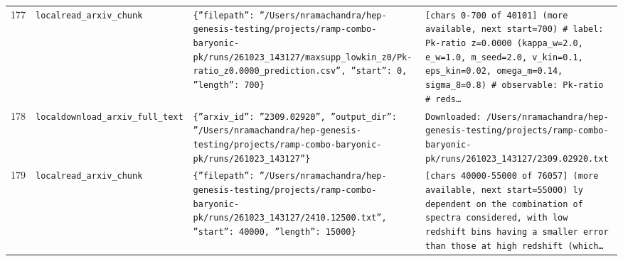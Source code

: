 \documentclass[11pt,a4paper]{article}
\begin{document}
\begin{longtable}{@{}p{}p{}p{}p{}@{}}
177 & \texttt{local}\newline\texttt{read\_\allowbreak{}arxiv\_\allowbreak{}chunk} & \texttt{\{''filepath'':\allowbreak{} ''/\allowbreak{}Users/\allowbreak{}nramachandra/\allowbreak{}hep-genesis-testing/\allowbreak{}projects/\allowbreak{}ramp-combo-baryonic-pk/\allowbreak{}runs/\allowbreak{}261023\_\allowbreak{}143127/\allowbreak{}maxsupp\_\allowbreak{}lowkin\_\allowbreak{}z0/\allowbreak{}Pk-ratio\_\allowbreak{}z0.0000\_\allowbreak{}prediction.csv'',\allowbreak{} ''start'':\allowbreak{} 0,\allowbreak{} ''length'':\allowbreak{} 700\}\allowbreak{}} & \texttt{[chars 0-700 of 40101]\allowbreak{} (more available,\allowbreak{} next start=\allowbreak{}700)\allowbreak{}  \# label:\allowbreak{} Pk-ratio z=\allowbreak{}0.0000 (kappa\_\allowbreak{}w=\allowbreak{}2.0,\allowbreak{} e\_\allowbreak{}w=\allowbreak{}1.0,\allowbreak{} m\_\allowbreak{}seed=\allowbreak{}2.0,\allowbreak{} v\_\allowbreak{}kin=\allowbreak{}0.1,\allowbreak{} eps\_\allowbreak{}kin=\allowbreak{}0.02,\allowbreak{} omega\_\allowbreak{}m=\allowbreak{}0.14,\allowbreak{} sigma\_\allowbreak{}8=\allowbreak{}0.8)\allowbreak{} \# observable:\allowbreak{} Pk-ratio \# reds\ldots{}\allowbreak{}} \\
178 & \texttt{local}\newline\texttt{download\_\allowbreak{}arxiv\_\allowbreak{}full\_\allowbreak{}text} & \texttt{\{''arxiv\_\allowbreak{}id'':\allowbreak{} ''2309.02920'',\allowbreak{} ''output\_\allowbreak{}dir'':\allowbreak{} ''/\allowbreak{}Users/\allowbreak{}nramachandra/\allowbreak{}hep-genesis-testing/\allowbreak{}projects/\allowbreak{}ramp-combo-baryonic-pk/\allowbreak{}runs/\allowbreak{}261023\_\allowbreak{}143127''\}\allowbreak{}} & \texttt{Downloaded:\allowbreak{} /\allowbreak{}Users/\allowbreak{}nramachandra/\allowbreak{}hep-genesis-testing/\allowbreak{}projects/\allowbreak{}ramp-combo-baryonic-pk/\allowbreak{}runs/\allowbreak{}261023\_\allowbreak{}143127/\allowbreak{}2309.02920.txt} \\
179 & \texttt{local}\newline\texttt{read\_\allowbreak{}arxiv\_\allowbreak{}chunk} & \texttt{\{''filepath'':\allowbreak{} ''/\allowbreak{}Users/\allowbreak{}nramachandra/\allowbreak{}hep-genesis-testing/\allowbreak{}projects/\allowbreak{}ramp-combo-baryonic-pk/\allowbreak{}runs/\allowbreak{}261023\_\allowbreak{}143127/\allowbreak{}2410.12500.txt'',\allowbreak{} ''start'':\allowbreak{} 40000,\allowbreak{} ''length'':\allowbreak{} 15000\}\allowbreak{}} & \texttt{[chars 40000-55000 of 76057]\allowbreak{} (more available,\allowbreak{} next start=\allowbreak{}55000)\allowbreak{}  ly dependent on the combination of spectra considered,\allowbreak{} with low redshift bins having a smaller error than those at high redshift (which\ldots{}\allowbreak{}} \\

\end{longtable}
\end{document}
